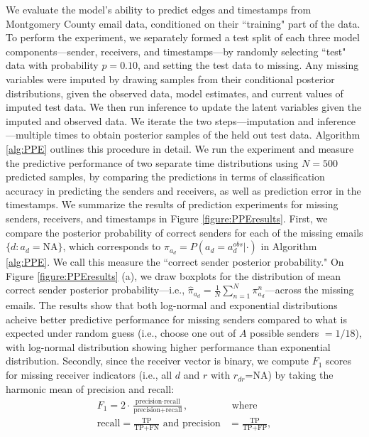 \documentclass[ba]{imsart}
\numberwithin{equation}{section}
\theoremstyle{plain}
\begin{document}
	We evaluate the model's ability to predict edges and timestamps from Montgomery County email data, conditioned on their ``training" part of the data. To perform the experiment, we separately formed a test split of each three model components---sender, receivers, and timestamps---by randomly selecting ``test" data with probability $p=0.10$, and setting the test data to missing. Any missing variables were imputed by drawing samples from their conditional posterior distributions, given the observed data, model estimates, and current values of imputed test data. We then run inference to update the latent variables given the imputed and observed data. We iterate the two steps---imputation and inference---multiple times to obtain posterior samples of the held out test data. Algorithm \ref{alg:PPE} outlines this procedure in detail. We run the experiment and measure the predictive performance of two separate time distributions using $N=500$ predicted samples, by comparing the predictions in terms of classification accuracy in predicting the senders and receivers, as well as prediction error in the timestamps. We summarize the results of prediction experiments for missing senders, receivers, and timestamps in Figure \ref{figure:PPEresults}. First, we compare the posterior probability of correct senders for each of the missing emails $\{d:a_d=\mbox{NA}\}$, which corresponds to $\pi_{a_{d}}=P(a_{d} = a^{obs}_{d}|\cdot)$ in Algorithm \ref{alg:PPE}. We call this measure the ``correct sender posterior probability." On Figure \ref{figure:PPEresults} (a), we draw boxplots for the distribution of mean correct sender posterior probability---i.e., $\hat{\pi}_{a_{d}} = \frac{1}{N}\sum_{n=1}^N \pi^n_{a_{d}}$---across the missing emails. The results show that both log-normal and exponential distributions acheive better predictive performance for missing senders compared to what is expected under random guess (i.e., choose one out of $A$ possible senders $=1/18$), with log-normal distribution showing higher performance than exponential distribution. Secondly, since the receiver vector is binary, we compute $F_1$ scores for missing receiver indicators (i.e., all $d$ and $r$ with $r_{dr}$=NA) by taking the harmonic mean of precision and recall:
	\begin{equation}
		\begin{aligned}
			F_1 =2\cdot\frac{\mbox{precision}\cdot \mbox{recall}}{\mbox{precision}+ \mbox{recall}}, &\mbox{ where } \\
			\mbox{recall}  = \frac{\mbox{TP}}{\mbox{TP+FN}} \mbox{ and } \mbox{precision} & =\frac{\mbox{TP}}{\mbox{TP+FP}},
		\end{aligned}
	\end{equation}
\end{document}
